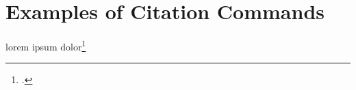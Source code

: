 \section*{Examples of Citation Commands}

\begin{description}[font=\ttfamily]
\item[\textbackslash cite\{worman\}:] \cite{worman}
\item[\textbackslash autocite\{worman\}:] \autocite{worman}
\item[\textbackslash textcite\{worman\}:] \textcite{worman}
\item[\textbackslash footcite\{worman\}:] lorem ipsum dolor\footcite{worman}
\end{description}

\printbibliography